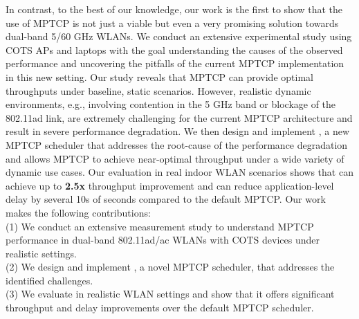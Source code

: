 In contrast, to the best of our knowledge, our work is the first to 
show that the use of MPTCP is not just a viable but even a very promising solution
towards dual-band 5/60 GHz WLANs. We conduct an extensive experimental
study using COTS APs and laptops with the goal 
understanding the causes of the observed performance and uncovering the
pitfalls of the current MPTCP implementation in this new setting.
Our study reveals that 
MPTCP can provide optimal throughputs under baseline, static scenarios.
 However, realistic dynamic environments, e.g., involving contention in the 5 GHz
band or blockage of the 802.11ad link, are extremely challenging for
the current MPTCP architecture and result in severe performance
degradation. We then design and implement \name, a new
MPTCP scheduler that addresses the root-cause of the performance
degradation and allows MPTCP to achieve near-optimal throughput under
a wide variety of dynamic use cases. Our evaluation in real
indoor WLAN scenarios shows that \name can achieve up to \textbf{2.5x}
throughput improvement and can reduce application-level delay by several
10s of seconds compared to the default MPTCP.
Our work makes the following contributions:
\\
(1) We conduct an extensive measurement study to understand MPTCP
performance in dual-band 802.11ad/ac WLANs with COTS devices under
realistic settings.
\\
(2) We design and implement \name, a novel MPTCP scheduler, that
addresses the identified challenges.
\\
(3) We evaluate \name in realistic WLAN settings and show that it
offers significant throughput and delay improvements over the default
MPTCP scheduler.
\fi
